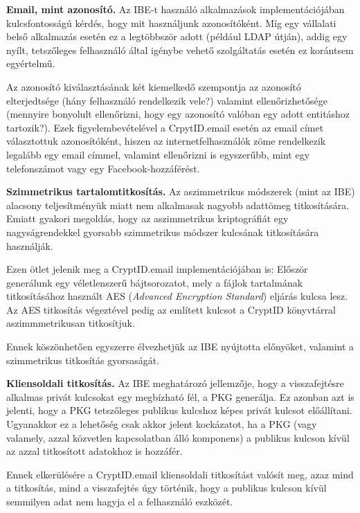 \begin{outdentlist}
    \item[]\textbf{Email, mint azonosító.}
    Az IBE-t használó alkalmazások implementációjában kulcsfontosságú kérdés, hogy mit használjunk azonosítóként. Míg egy vállalati belső alkalmazás esetén ez a legtöbbször adott (például LDAP útján), addig egy nyílt, tetszőleges felhasználó által igénybe vehető szolgáltatás esetén ez korántsem egyértelmű.
    
    Az azonosító kiválasztásának két kiemelkedő szempontja az azonosító elterjedtsége (hány felhasználó rendelkezik vele?) valamint ellenőrizhetősége (mennyire bonyolult ellenőrizni, hogy egy azonosító valóban egy adott entitáshoz tartozik?). Ezek figyelembevételével a CrpytID.email esetén az email címet választottuk azonosítóként, hiszen az internetfelhasználók zöme rendelkezik legalább egy email címmel, valamint ellenőrizni is egyszerűbb, mint egy telefonszámot vagy egy Facebook-hozzáférést.

    \item[]\textbf{Szimmetrikus tartalomtitkosítás.}
    Az aszimmetrikus módszerek (mint az IBE) alacsony teljesítményük miatt nem alkalmasak nagyobb adattömeg titkosítására. Emiatt gyakori megoldás, hogy az aszimmetrikus kriptográfiát egy nagyságrendekkel gyorsabb szimmetrikus módszer kulcsának titkosítására használják. 

    Ezen ötlet jelenik meg a CryptID.email implementációjában is: Először generálunk egy véletlenszerű bájtsorozatot, mely a fájlok tartalmának titkosításához használt AES (\textit{Advanced Encryption Standard}) eljárás kulcsa lesz. Az AES titkosítás végeztével pedig az említett kulcsot a CryptID könyvtárral aszimmmetrikusan titkosítjuk.

    Ennek köszönhetően egyszerre élvezhetjük az IBE nyújtotta előnyöket, valamint a szimmetrikus titkosítás gyorsaságát.

    \item[]\textbf{Kliensoldali titkosítás.}
    Az IBE meghatározó jellemzője, hogy a visszafejtésre alkalmas privát kulcsokat egy megbízható fél, a PKG generálja. Ez azonban azt is jelenti, hogy a PKG tetszőleges publikus kulcshoz képes privát kulcsot előállítani. Ugyanakkor ez a lehetőség csak akkor jelent kockázatot, ha a PKG (vagy valamely, azzal közvetlen kapcsolatban álló komponens) a publikus kulcson kívül az azzal titkosított adatokhoz is hozzáfér.

    Ennek elkerülésére a CryptID.email kliensoldali titkosítást valósít meg, azaz mind a titkosítás, mind a visszafejtés úgy történik, hogy a publikus kulcson kívül semmilyen adat nem hagyja el a felhasználó eszközét.

\end{outdentlist}

